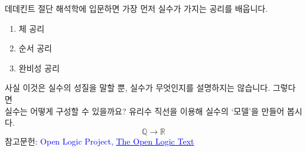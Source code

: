 \documentclass[serif]{beamer}
\begin{document}
\begin{frame}{데데킨트 절단}
    해석학에 입문하면 가장 먼저 실수가 가지는 공리를 배웁니다.
    \begin{enumerate}[-]
        \item 체 공리
        \item 순서 공리
        \item 완비성 공리
    \end{enumerate}
    사실 이것은 실수의 성질을 말할 뿐, 실수가 무엇인지를 설명하지는 않습니다.
    그렇다면 \\ 실수는 어떻게 구성할 수 있을까요? 유리수 직선을 이용해 실수의 `모델'을 만들어 봅시다.
    \[
        \mathbb Q \longrightarrow \mathbb R
    \]
    참고문헌: \textcolor{blue}{Open Logic Project, \underline{The Open Logic Text}}
\end{frame}
\end{document}
